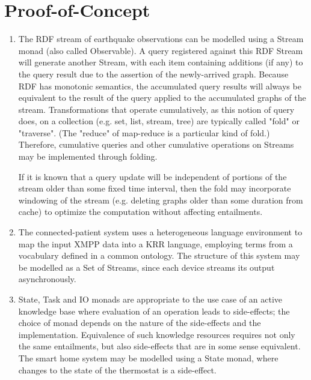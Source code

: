 \documentclass[runningheads]{llncs}
\begin{document}

\section{Proof-of-Concept}


\begin{enumerate}
\item The RDF stream of earthquake observations can be modelled using a Stream monad (also called Observable).
A query registered against this RDF Stream will generate another Stream, with each item containing additions (if any) to the query result due to the assertion of the newly-arrived graph.
Because RDF has monotonic semantics, the accumulated query results will always be equivalent to the result of the query applied to the accumulated graphs of the stream.
Transformations that operate cumulatively, as this notion of query does, on a collection (e.g. set, list, stream, tree) are typically called "fold" or "traverse". (The "reduce" of map-reduce is a particular kind of fold.)
Therefore, cumulative queries and other cumulative operations on Streams may be implemented through folding.

If it is known that a query update will be independent of portions of the stream older than some fixed time interval, then
the fold may incorporate windowing of the stream (e.g. deleting graphs older than some duration from cache) to optimize the computation without affecting entailments.

\item The connected-patient system uses a heterogeneous language environment to map the input XMPP data into a KRR language, employing terms from a vocabulary defined in a common ontology. The structure of this system may be modelled as a Set of Streams, since each device streams its output asynchronously.

\item State, Task and IO monads are appropriate to the use case of an active knowledge base where evaluation of an operation leads to side-effects; the choice of monad depends on the nature of the side-effects and the implementation.
Equivalence of such knowledge resources requires not only the same entailments, but also side-effects that are in some sense equivalent.
The smart home system may be modelled using a State monad, where changes to the state of the thermostat is a side-effect.


\end{enumerate}
\end{document}

